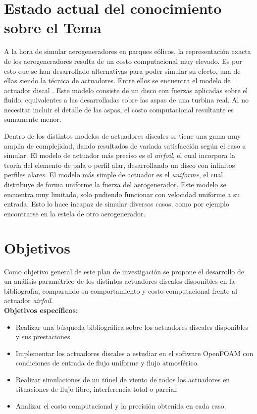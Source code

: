 \documentclass{article}
\numberwithin{equation}{subsection}
\begin{document}
\section{Estado actual del conocimiento sobre el Tema}
A la hora de simular aerogeneradores en parques eólicos, la representación exacta de los aerogeneradores resulta de un costo computacional muy elevado. Es por esto que se han desarrollado alternativas para poder simular su efecto, una de ellas siendo la técnica de actuadores. Entre ellos se encuentra el modelo de actuador discal \cite{mikkelsen_actuator_2004}. Este modelo consiste de un disco con fuerzas aplicadas sobre el fluido, equivalentes a las desarrolladas sobre las aspas de una turbina real. Al no necesitar incluir el detalle de las aspas, el costo computacional resultante es sumamente menor.

Dentro de los distintos modelos de actuadores discales se tiene una gama muy amplia de complejidad, dando resultados de variada satisfacción según el caso a simular. El modelo de actuador más preciso es el \textit{airfoil}, el cual incorpora la teoría del elemento de pala o perfil alar, desarrollando un disco con infinitos perfiles alares. El modelo más simple de actuador es el \textit{uniforme}, el cual distribuye de forma uniforme la fuerza del aerogenerador. Este modelo se encuentra muy limitado, solo pudiendo funcionar con velocidad uniforme a su entrada. Esto lo hace incapaz de simular diversos casos, como por ejemplo encontrarse en la estela de otro aerogenerador.

\section{Objetivos}
Como objetivo general de este plan de investigación se propone el desarrollo de un análisis paramétrico de los distintos actuadores discales disponibles en la bibliografía, comparando su comportamiento y costo computacional frente al actuador \textit{airfoil}.\\

\textbf{Objetivos específicos:}
\begin{itemize}
	\item Realizar una búsqueda bibliográfica sobre los actuadores discales disponibles y sus prestaciones.
	\item Implementar los actuadores discales a estudiar en el software OpenFOAM con condiciones de entrada de flujo uniforme y flujo atmosférico.
	\item Realizar simulaciones de un túnel de viento de todos los actuadores en situaciones de flujo libre, interferencia total o parcial.
	\item Analizar el costo computacional y la precisión obtenida en cada caso.
\end{itemize}
\end{document}
